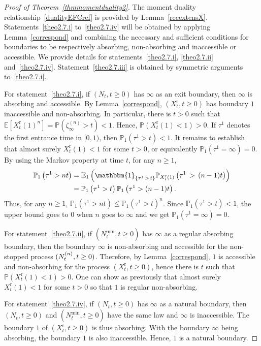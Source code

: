 \documentclass[AHL,Unicode,longabstracts,published]{cedram}
\newcommand{\rmr}{\mathrm{r}}
\newcommand{\bbmun}{\mathbbm{1}}
\newcommand{\bbE}{\mathbb{E}}
\newcommand{\bbP}{\mathbb{P}}
\begin{document}
\begin{proof}[{Proof of Theorem~\ref{thmmomentduality2}}] The moment duality relationship~\eqref{dualityEFCref} is provided by Lemma~\ref{recextensX}. Statements~\eqref{theo2.7.i} to~\eqref{theo2.7.iv}  will be obtained by applying Lemma~\ref{correspond} and combining the necessary and sufficient conditions for boundaries to be respectively absorbing, non-absorbing and inaccessible or accessible. We provide details for statements~\eqref{theo2.7.i}, \eqref{theo2.7.ii} and~\eqref{theo2.7.iv}. Statement~\eqref{theo2.7.iii} is obtained by symmetric arguments to~\eqref{theo2.7.i}.

For statement~\eqref{theo2.7.i}, if $(N_t,t\geq 0)$ has $\infty$ as an exit boundary, then $\infty$ is absorbing and accessible. By Lemma~\ref{correspond}, $(X_t^{\rmr},t\geq 0)$ has boundary $1$ inaccessible and non-absorbing. In particular, there is $t>0$ such that $\bbE[X_t^{\rmr}(1)^{n}]=\bbP(\zeta^{(n)}_\infty>t)<1$. Hence, $\bbP(X^{\rmr}_t(1)<1)>0$. If $\tau^1$ denotes the first entrance time in $[0,1)$, then $\bbP_1(\tau^1>t)<1$. It remains to establish that almost surely $X^{\rmr}_t(1)<1$ for some $t>0$, or equivalently $\bbP_1(\tau^1=\infty)=0$. By using the Markov property at time $t$, for any $n\geq 1$,
\begin{align*}
\bbP_1\left(\tau^1>nt\right) &=\bbE_1\left(\bbmun_{\left\{\tau^1\,>\,t\right\}}\bbP_{X^{\rmr}_{t}(1)}\left(\tau^1\,>\,(n-1)t\right)\right)\\
&=\bbP_{1}\left(\tau^1>t\right)\bbP_1\left(\tau^1>(n-1)t\right).
\end{align*}
Thus, for any $n\geq 1$, $\bbP_1(\tau^1>nt)\leq \bbP_1(\tau^1>t)^n$. Since $\bbP_1(\tau^1>t)<1$, the upper bound goes to $0$ when $n$ goes to $\infty$ and we get $\bbP_1(\tau^1=\infty)=0$.

\pagebreak
For statement~\eqref{theo2.7.ii}, if $(N^{\min}_t,t\geq 0)$ has $\infty$ as a regular absorbing boundary, then the boundary $\infty$ is non-absorbing and accessible for the non-stopped process $(N_t^{(n)},\linebreak t\geq 0)$. Therefore, by Lemma~\ref{correspond}, $1$ is accessible and non-absorbing for the process $(X_t^{\rmr},t\geq 0)$, hence there is $t$ such that $\bbP(X^{\rmr}_t(1)<1)>0$. One can show as previously that almost surely $X^{\rmr}_t(1)<1$ for some $t>0$ so that $1$ is regular non-absorbing.

For statement~\eqref{theo2.7.iv}, if $(N_t,t\geq 0)$ has $\infty$ as a natural boundary, then $(N_t,t\geq 0)$ and $(N^{\min}_t,t\geq 0)$ have the same law and $\infty$ is inaccessible. The boundary $1$ of $(X_t^{\rmr},t\geq 0)$ is thus absorbing. With the boundary $\infty$ being absorbing, the boundary $1$ is also inaccessible. Hence, $1$ is a natural boundary.
\end{proof}
\end{document}
